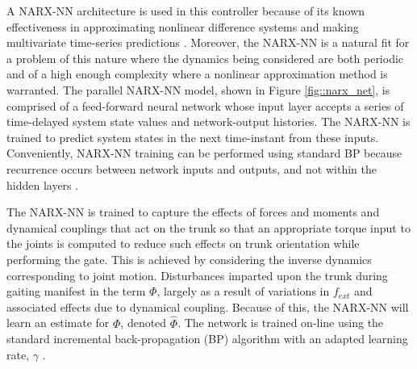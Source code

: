 
A NARX-NN architecture is used in this controller because of  its known effectiveness in approximating nonlinear difference systems and 
making multivariate time-series predictions \cite{Tsungnan1996,ChenBillings1990,Hihi1996,Billings2013}. 
Moreover, the NARX-NN is a natural fit for a problem of this nature where the dynamics being considered are both periodic and of a 
high enough complexity where a nonlinear approximation method is warranted.
The parallel NARX-NN model, shown in Figure \ref{fig::narx_net}, is comprised of a feed-forward neural network whose input
layer accepts a series of time-delayed system state values and network-output histories. The NARX-NN is trained to predict 
system states in the next time-instant from these inputs. Conveniently, NARX-NN training can be performed 
using standard BP because recurrence occurs between network inputs and outputs, and not within the hidden layers 
\cite{Nelles2001}.

The NARX-NN is trained to capture the effects of forces and moments and dynamical couplings that act on the trunk
so that an appropriate torque input to the joints is computed to reduce such effects on trunk orientation while performing
the gate. This is achieved by considering the inverse dynamics corresponding to joint motion. Disturbances imparted upon the trunk during gaiting manifest in the term $\Phi$, largely as a result of variations in $f_{ext}$ and associated effects due to dynamical coupling. Because of this, the NARX-NN will learn an estimate for $\Phi$, denoted $\hat{\Phi}$. The network is trained on-line using the standard incremental back-propagation (BP) algorithm with an adapted learning rate, $\gamma$ \cite{Rumelhart1988,Rumelhart1995}.

